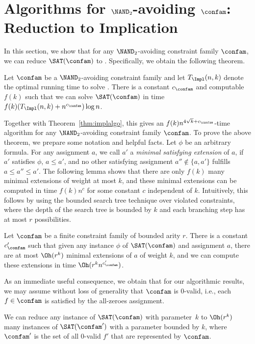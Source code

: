 \section{Algorithms for $\NAND_2$-avoiding $\confam$: Reduction to Implication}
\label{sec:redtoImpl}
%
In this section, we show that for any $\NAND_{2}$-avoiding constraint family $\confam$, we can reduce $\SAT(\confam)$ to \Implication. Specifically, we obtain the following theorem.
\begin{thm}\label{thm:redtoImpl}
Let $\confam$ be a $\NAND_2$-avoiding constraint family and let $T_\Impl(n,k)$ denote the optimal running time to solve \Implication. There is a constant $c_\confam$ and computable $f(k)$ such that we can solve $\SAT(\confam)$ in time 
$f(k)( T_\Impl(n,k) + n^{c_\confam})\log n$.
\end{thm}
%
Together with Theorem~\ref{thm:implalgo}, this gives an $f(k)n^{4\sqrt{k} + c_\confam}$-time algorithm for any $\NAND_2$-avoiding constraint family $\confam$.
%
To prove the above theorem, we prepare some notation and helpful facts. Let $\phi$ be an arbitrary formula.  For any assignment $a$, we call $a'$ a \emph{minimal satisfying extension} of $a$, if $a'$ satisfies $\phi$, $a\le a'$, and no other satisfying assignment $a''\notin \{a,a'\}$ fulfills $a\le a'' \le a'$. The following lemma shows that there are only $f(k)$ many minimal extensions of weight at most $k$, and these minimal extensions can be computed in time $f(k) n^{c}$ for some constant $c$ independent of $k$. Intuitively, this follows by using the bounded search tree technique over violated constraints, where the depth of the search tree is bounded by $k$ and each branching step has at most $r$ possibilities.
%
\begin{lem}\label{lem:minextensions}
Let $\confam$ be a finite constraint family of bounded arity $r$. There is a constant $c_\confam'$ such that given any instance $\phi$ of $\SAT(\confam)$ and assignment $a$, there are at most $\Oh(r^k)$ minimal extensions of $a$ of weight $k$, and we can compute these extensions in time $\Oh(r^k n^{c'_\confam})$. 
\end{lem}
%
As an immediate useful consequence, we obtain that for our algorithmic results, we may assume without loss of generality that $\confam$ is $0$-valid, i.e., each $f\in \confam$ is satisfied by the all-zeroes assignment.
\begin{cor}\label{cor:wlog0valid}
We can reduce any instance of $\SAT(\confam)$ with parameter~$k$ to $\Oh(r^k)$ many instances of $\SAT(\confam')$ with a parameter bounded by $k$, where $\confam'$ is the set of all $0$-valid $f'$ that are represented by $\confam$.
\end{cor}
